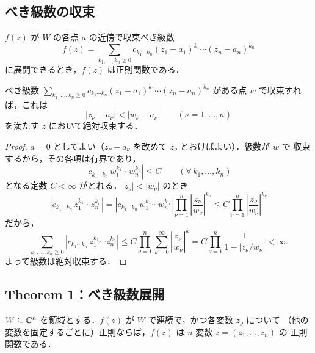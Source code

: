 \subsection*{べき級数の収束}

\begin{note}
$f(z)$ が $W$ の各点 $a$ の近傍で収束べき級数
\[
  f(z) = \sum_{k_1, \dots, k_n \ge 0}
    c_{k_1 \cdots k_n} (z_1 - a_1)^{k_1} \cdots (z_n - a_n)^{k_n}
\]
に展開できるとき，$f(z)$ は正則関数である．
\end{note}

\begin{proposition}\label{cl:abel}
べき級数 $\sum_{k_1, \dots, k_n \ge 0} c_{k_1 \cdots k_n}
(z_1 - a_1)^{k_1} \cdots (z_n - a_n)^{k_n}$ がある点 $w$ で収束すれば，これは
\[
  |z_\nu - a_\nu| < |w_\nu - a_\nu| \qquad (\nu = 1, \dots, n)
\]
を満たす $z$ において絶対収束する．
\end{proposition}

\begin{proof}
$a = 0$ としてよい（$z_\nu - a_\nu$ を改めて $z_\nu$ とおけばよい）．級数が $w$ で
収束するから，その各項は有界であり，
\[
  |c_{k_1 \cdots k_n} \, w_1^{k_1} \cdots w_n^{k_n}| \le C
  \qquad (\forall\, k_1, \dots, k_n)
\]
となる定数 $C < \infty$ がとれる．$|z_\nu| < |w_\nu|$ のとき
\[
  |c_{k_1 \cdots k_n} \, z_1^{k_1} \cdots z_n^{k_n}|
  = |c_{k_1 \cdots k_n} \, w_1^{k_1} \cdots w_n^{k_n}|
    \prod_{\nu=1}^n \left| \frac{z_\nu}{w_\nu} \right|^{k_\nu}
  \le C \prod_{\nu=1}^n \left| \frac{z_\nu}{w_\nu} \right|^{k_\nu}
\]
だから，
\[
  \sum_{k_1, \dots, k_n \ge 0} |c_{k_1 \cdots k_n} \, z_1^{k_1} \cdots z_n^{k_n}|
  \le C \prod_{\nu=1}^n \sum_{k=0}^\infty \left| \frac{z_\nu}{w_\nu} \right|^{k}
  = C \prod_{\nu=1}^n \frac{1}{1 - |z_\nu / w_\nu|} < \infty .
\]
よって級数は絶対収束する．
\end{proof}

\subsection*{Theorem 1：べき級数展開}

\begin{theorem}\label{thm:power-series}
$W \subseteq \mathbb{C}^n$ を領域とする．$f(z)$ が $W$ で連続で，かつ各変数 $z_\nu$ について
（他の変数を固定するごとに）正則ならば，$f(z)$ は $n$ 変数 $z = (z_1, \dots, z_n)$ の
正則関数である．
\end{theorem}

